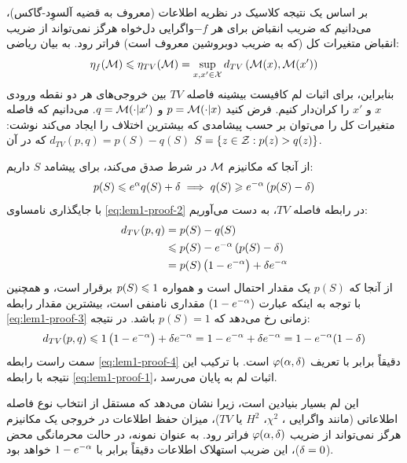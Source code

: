 \begin{اثبات}
بر اساس یک نتیجه کلاسیک در نظریه اطلاعات (معروف به قضیه آلسوِد-گاکس)، می‌دانیم که ضریب انقباض برای هر $-f$واگرایی دل‌خواه هرگز نمی‌تواند از ضریب انقباض متغیرات کل (که به ضریب دوبروشین معروف است) فراتر رود. به بیان ریاضی:
\begin{equation}
\label{eq:lem1-proof-1}
\eta_f(\mech) \lee \eta_{TV}(\mech) = \sup_{x, x' \in \Xset} d_{TV}\left( \mech(x), \mech(x') \right)
\end{equation}
بنابراین، برای اثبات لم کافیست بیشینه فاصله $TV$ بین خروجی‌های هر دو نقطه ورودی $x$ و $x'$ را کران‌دار کنیم. فرض کنید $p = \mech(\cdot|x)$ و $q = \mech(\cdot|x')$. می‌دانیم که فاصله متغیرات کل را می‌توان بر حسب پیشامدی که بیشترین اختلاف را ایجاد می‌کند نوشت: $d_{TV}(p, q) = p(S) - q(S)$ که در آن $S = \left\{ z \in \Zset : p(z) > q(z) \right\}$.

از آنجا که مکانیزم $\mech$ در شرط \LDP[(\al,\del)] صدق می‌کند، برای پیشامد $S$ داریم:
\begin{equation}
\label{eq:lem1-proof-2}
p(S) \leqslant e^{\alpha} q(S) + \delta \implies q(S) \geqslant e^{-\alpha} \left( p(S) - \delta \right)
\end{equation}
با جایگذاری نامساوی \eqref{eq:lem1-proof-2} در رابطه فاصله $TV$، به دست می‌آوریم:
\begin{align}
d_{TV}(p, q) &= p(S) - q(S) \nonumber \\
&\leqslant p(S) - e^{-\alpha} \left( p(S) - \delta \right) \nonumber \\
&= p(S) \left( 1 - e^{-\alpha} \right) + \delta e^{-\alpha} \label{eq:lem1-proof-3}
\end{align}
از آنجا که $p(S)$ یک مقدار احتمال است و همواره $p(S) \leqslant 1$ برقرار است، و همچنین با توجه به اینکه عبارت $\left( 1 - e^{-\alpha} \right)$ مقداری نامنفی است، بیشترین مقدار رابطه \eqref{eq:lem1-proof-3} زمانی رخ می‌دهد که $p(S) = 1$ باشد. در نتیجه:
\begin{equation}
\label{eq:lem1-proof-4}
d_{TV}(p, q) \leqslant 1 \left( 1 - e^{-\alpha} \right) + \delta e^{-\alpha} = 1 - e^{-\alpha} + \delta e^{-\alpha} = 1 - e^{-\alpha} (1 - \delta)
\end{equation}
سمت راست رابطه \eqref{eq:lem1-proof-4} دقیقاً برابر با تعریف $\varphi(\alpha, \delta)$ است. با ترکیب این نتیجه با رابطه \eqref{eq:lem1-proof-1}، اثبات لم به پایان می‌رسد.
\end{اثبات}

این لم بسیار بنیادین است، زیرا نشان می‌دهد که مستقل از انتخاب نوع فاصله اطلاعاتی (مانند واگرایی ، $\chi^2$، $H^2$ یا $TV$)، میزان حفظ اطلاعات در خروجی یک مکانیزم \LDP[(\al,\del)] هرگز نمی‌تواند از ضریب $\varphi(\alpha, \delta)$ فراتر رود. به عنوان نمونه، در حالت محرمانگی محض ($\delta = 0$)، این ضریب استهلاک اطلاعات دقیقاً برابر با $1 - e^{-\alpha}$ خواهد بود.

